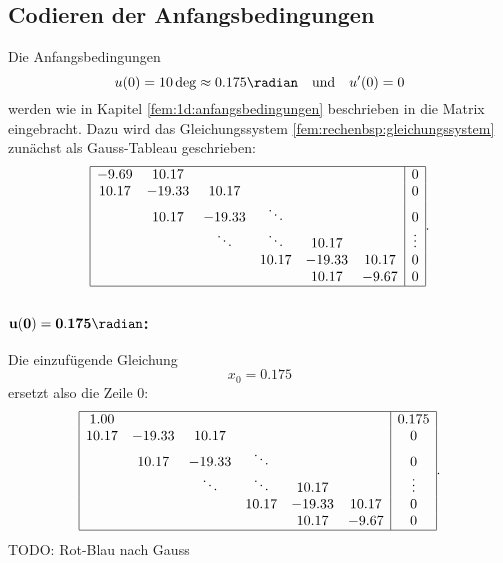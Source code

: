 \subsection{Codieren der Anfangsbedingungen}
Die Anfangsbedingungen
\begin{equation}
    u(0) = 10 \deg \approx 0.175 \radian
    \quad \text{und} \quad
    u'(0) = 0
\end{equation}
werden wie in Kapitel \ref{fem:1d:anfangsbedingungen} beschrieben in die Matrix eingebracht.
Dazu wird das Gleichungssystem \ref{fem:rechenbsp:gleichungssystem} zunächst als Gauss-Tableau geschrieben:
\begin{equation}
    \begin{array}{|cccccc|c|}
        \hline
        -9.69  & 10.17  &        &        &        &        & 0      \\
        10.17  &-19.33  & 10.17  &        &        &        & 0      \\
               & 10.17  &-19.33  & \ddots &        &        & 0      \\
               &        & \ddots & \ddots & 10.17  &        & \vdots \\
               &        &        & 10.17  &-19.33  & 10.17  & 0      \\
               &        &        &        & 10.17  & -9.67  & 0      \\
        \hline
    \end{array}.
\end{equation}

\subsubsection{$\mathbf{u(0) = 0.175 \radian}$:}
Die einzufügende Gleichung
\begin{equation}
    x_0 = 0.175
\end{equation}
ersetzt also die Zeile $0$:
\begin{equation}
    \begin{array}{|cccccc|c|}
        \hline
         1.00  &        &        &        &        &        & 0.175  \\
        10.17  &-19.33  & 10.17  &        &        &        & 0      \\
               & 10.17  &-19.33  & \ddots &        &        & 0      \\
               &        & \ddots & \ddots & 10.17  &        & \vdots \\
               &        &        & 10.17  &-19.33  & 10.17  & 0      \\
               &        &        &        & 10.17  & -9.67  & 0      \\
        \hline
    \end{array}.
\end{equation}
TODO: Rot-Blau nach Gauss

